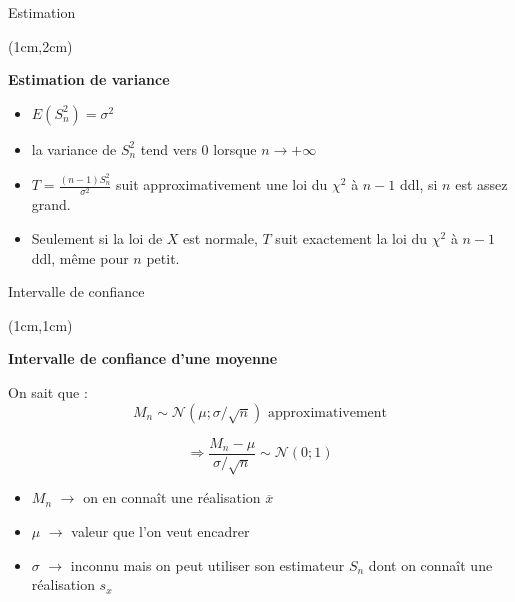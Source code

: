 \documentclass{beamer}
\begin{document}
 

\begin{frame}{Estimation}
\begin{textblock*}{\textwidth}(1cm,2cm)

\begin{center}{\bf \Large Estimation de variance} \end{center}
\vspace{0.5cm}
\begin{itemize}
\item $E(S^2_n) = \sigma^2$ 
\vspace{0.3cm}
\item la variance de $S_n^2$ tend vers 0 lorsque $n\rightarrow +\infty$
\vspace{0.3cm}
\item $\displaystyle T=\frac{(n-1)S^2_n}{\sigma^2}$ suit approximativement une loi du $\chi^2$ à $n-1$ ddl, si $n$ est assez grand.
\item Seulement si la loi de $X$ est normale, $T$ suit exactement la loi du $\chi^2$ à $n-1$ ddl, même pour $n$ petit.
\end{itemize}


\end{textblock*}

\end{frame}


\begin{frame}{Intervalle de confiance}
\begin{textblock*}{\textwidth}(1cm,1cm)

\begin{center}{\bf \Large Intervalle de confiance d'une moyenne} \end{center}
\vspace{0.5cm}
On sait que :
$$
M_n\sim \mathcal{N}(\mu ; \sigma/\sqrt{n}) \text{ approximativement}
$$

$$
\Rightarrow \frac{M_n-\mu}{\sigma/\sqrt{n}} \sim \mathcal{N}(0 ; 1)
$$

\begin{itemize}
\item $M_n$ $\rightarrow$ on en connaît une réalisation $\overline{x}$
\item $\mu$ $\rightarrow$ valeur que l'on veut encadrer
\item $\sigma$ $\rightarrow$ inconnu mais on peut utiliser son estimateur $S_n$ dont on connaît une réalisation $s_x$ 
\end{itemize}

\end{textblock*}

\end{frame}
\end{document}
